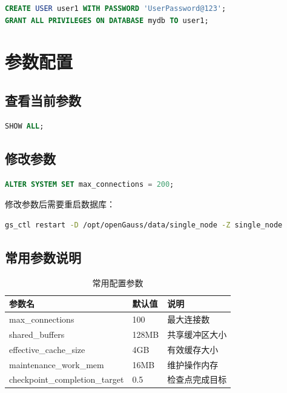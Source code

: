 \documentclass[12pt,UTF8]{ctexbook}
\begin{document}
\begin{lstlisting}[language=sql, caption=创建普通用户]
CREATE USER user1 WITH PASSWORD 'UserPassword@123';
GRANT ALL PRIVILEGES ON DATABASE mydb TO user1;
\end{lstlisting}

\section{参数配置}

\subsection{查看当前参数}

\begin{lstlisting}[language=sql, caption=查看数据库参数]
SHOW ALL;
\end{lstlisting}

\subsection{修改参数}

\begin{lstlisting}[language=sql, caption=修改连接数参数]
ALTER SYSTEM SET max_connections = 200;
\end{lstlisting}

修改参数后需要重启数据库：

\begin{lstlisting}[language=bash, caption=重启数据库]
gs_ctl restart -D /opt/openGauss/data/single_node -Z single_node
\end{lstlisting}

\subsection{常用参数说明}

\begin{table}[htbp]
    \centering
    \caption{常用配置参数}
    \label{tab:common_params}
    \begin{tabular}{|l|l|l|}
    \hline
    \textbf{参数名} & \textbf{默认值} & \textbf{说明} \\ \hline
    max\_connections & 100 & 最大连接数 \\ \hline
    shared\_buffers & 128MB & 共享缓冲区大小 \\ \hline
    effective\_cache\_size & 4GB & 有效缓存大小 \\ \hline
    maintenance\_work\_mem & 16MB & 维护操作内存 \\ \hline
    checkpoint\_completion\_target & 0.5 & 检查点完成目标 \\ \hline
    \end{tabular}
\end{table}
\end{document}
